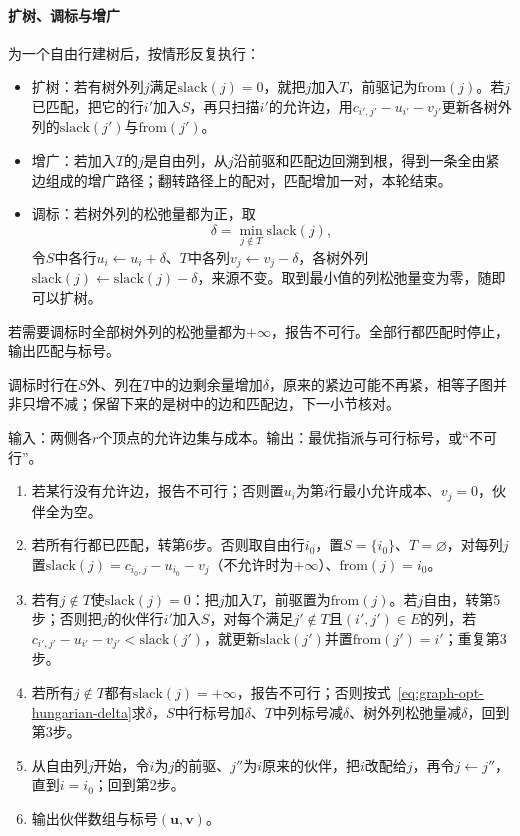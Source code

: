\paragraph{扩树、调标与增广}
为一个自由行建树后，按情形反复执行：
\begin{itemize}
  \item 扩树：若有树外列$j$满足$\mathrm{slack}(j)=0$，就把$j$加入$T$，前驱记为$\mathrm{from}(j)$。若$j$已匹配，把它的行$i'$加入$S$，再只扫描$i'$的允许边，用$c_{i',j'}-u_{i'}-v_{j'}$更新各树外列的$\mathrm{slack}(j')$与$\mathrm{from}(j')$。
  \item 增广：若加入$T$的$j$是自由列，从$j$沿前驱和匹配边回溯到根，得到一条全由紧边组成的增广路径；翻转路径上的配对，匹配增加一对，本轮结束。
  \item 调标：若树外列的松弛量都为正，取
  \begin{equation}
    \delta=\min_{j\notin T}\mathrm{slack}(j),
    \label{eq:graph-opt-hungarian-delta}
  \end{equation}
  令$S$中各行$u_i\gets u_i+\delta$、$T$中各列$v_j\gets v_j-\delta$，各树外列$\mathrm{slack}(j)\gets\mathrm{slack}(j)-\delta$，来源不变。取到最小值的列松弛量变为零，随即可以扩树。
\end{itemize}
若需要调标时全部树外列的松弛量都为$+\infty$，报告不可行。全部行都匹配时停止，输出匹配与标号。

调标时行在$S$外、列在$T$中的边剩余量增加$\delta$，原来的紧边可能不再紧，相等子图并非只增不减；保留下来的是树中的边和匹配边，下一小节核对。

\begin{algorithm}[KM算法]
\label{alg:graph-opt-hungarian}
输入：两侧各$r$个顶点的允许边集与成本。输出：最优指派与可行标号，或“不可行”。
\begin{enumerate}
  \item 若某行没有允许边，报告不可行；否则置$u_i$为第$i$行最小允许成本、$v_j=0$，伙伴全为空。
  \item 若所有行都已匹配，转第6步。否则取自由行$i_0$，置$S=\{i_0\}$、$T=\varnothing$，对每列$j$置$\mathrm{slack}(j)=c_{i_0,j}-u_{i_0}-v_j$（不允许时为$+\infty$）、$\mathrm{from}(j)=i_0$。
  \item 若有$j\notin T$使$\mathrm{slack}(j)=0$：把$j$加入$T$，前驱置为$\mathrm{from}(j)$。若$j$自由，转第5步；否则把$j$的伙伴行$i'$加入$S$，对每个满足$j'\notin T$且$(i',j')\in E$的列，若$c_{i',j'}-u_{i'}-v_{j'}<\mathrm{slack}(j')$，就更新$\mathrm{slack}(j')$并置$\mathrm{from}(j')=i'$；重复第3步。
  \item 若所有$j\notin T$都有$\mathrm{slack}(j)=+\infty$，报告不可行；否则按式~\eqref{eq:graph-opt-hungarian-delta}求$\delta$，$S$中行标号加$\delta$、$T$中列标号减$\delta$、树外列松弛量减$\delta$，回到第3步。
  \item 从自由列$j$开始，令$i$为$j$的前驱、$j''$为$i$原来的伙伴，把$i$改配给$j$，再令$j\gets j''$，直到$i=i_0$；回到第2步。
  \item 输出伙伴数组与标号$(\bm u,\bm v)$。
\end{enumerate}
\end{algorithm}

